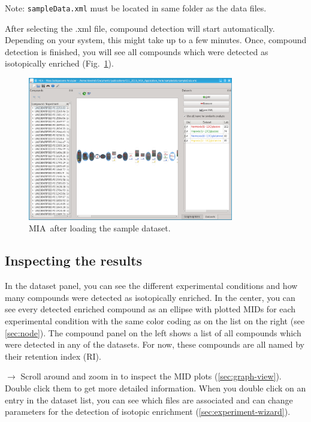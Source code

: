 \documentclass[a4paper,12pt]{scrartcl}
\newcommand*\app{\textsc{MIA}}
\newcommand*\MD{\textsc{MetaboliteDetector}}
\begin{document}
Note: \texttt{sampleData.xml} must be located in same folder as the data files.

After selecting the .xml file, compound detection will start automatically. Depending on your system, this might take up to a few minutes. Once, compound detection is finished, you will see all compounds which were detected as isotopically enriched (Fig.~\ref{fig:tutorial-dataloaded}).

\begin{figure}[htbp]
 \centering
 \includegraphics[width=0.8\textwidth]{./gfx/ss_tutorial_dataloaded.png}
 \caption{\app\ after loading the sample dataset.}
 \label{fig:tutorial-dataloaded}
\end{figure}



\subsection{Inspecting the results}

In the dataset panel, you can see the different experimental conditions and how many compounds were detected as isotopically enriched. In the center, you can see every detected enriched compound as an ellipse with plotted MIDs for each experimental condition with the same color coding as on the list on the right (see \ref{sec:node}). The compound panel on the left shows a list of all compounds which were detected in any of the datasets. For now, these compounds are all named by their retention index (RI).

$\rightarrow$ Scroll around and zoom in to inspect the MID plots (\ref{sec:graph-view}). Double click them to get more detailed information. When you double click on an entry in the dataset list, you can see which files are associated and can change parameters for the detection of isotopic enrichment (\ref{sec:experiment-wizard}).
\end{document}
